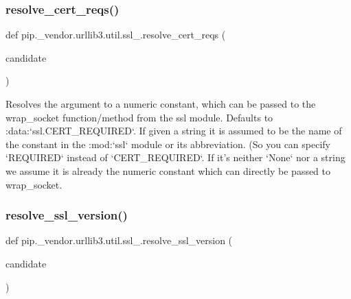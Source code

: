 \mbox{\label{namespacepip_1_1__vendor_1_1urllib3_1_1util_1_1ssl___abdfa9050f36e5884aa19d2106d06f19c}} 
\subsubsection{\texorpdfstring{resolve\+\_\+cert\+\_\+reqs()}{resolve\_cert\_reqs()}}
{\footnotesize\ttfamily def pip.\+\_\+vendor.\+urllib3.\+util.\+ssl\+\_\+.\+resolve\+\_\+cert\+\_\+reqs (\begin{DoxyParamCaption}\item[{}]{candidate }\end{DoxyParamCaption})}

\begin{DoxyVerb}Resolves the argument to a numeric constant, which can be passed to
the wrap_socket function/method from the ssl module.
Defaults to :data:`ssl.CERT_REQUIRED`.
If given a string it is assumed to be the name of the constant in the
:mod:`ssl` module or its abbreviation.
(So you can specify `REQUIRED` instead of `CERT_REQUIRED`.
If it's neither `None` nor a string we assume it is already the numeric
constant which can directly be passed to wrap_socket.
\end{DoxyVerb}
 \mbox{\label{namespacepip_1_1__vendor_1_1urllib3_1_1util_1_1ssl___a3fd2230196e0721cb2e25bd9def8e7ef}} 
\subsubsection{\texorpdfstring{resolve\+\_\+ssl\+\_\+version()}{resolve\_ssl\_version()}}
{\footnotesize\ttfamily def pip.\+\_\+vendor.\+urllib3.\+util.\+ssl\+\_\+.\+resolve\+\_\+ssl\+\_\+version (\begin{DoxyParamCaption}\item[{}]{candidate }\end{DoxyParamCaption})}

